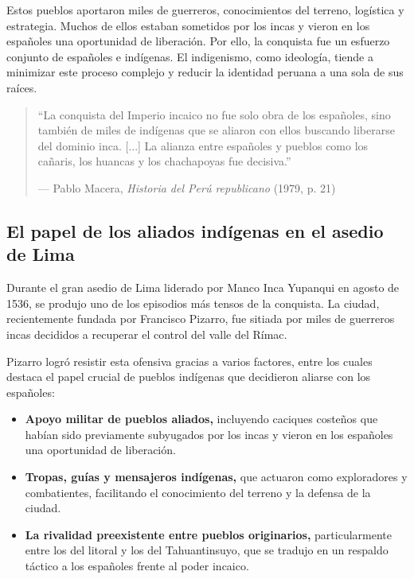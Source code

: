 \documentclass[a4paper,12pt]{article}
\begin{document}
Estos pueblos aportaron miles de guerreros, conocimientos del terreno, logística y estrategia. Muchos de ellos estaban sometidos por los incas y vieron en los españoles una oportunidad de liberación. Por ello, la conquista fue un esfuerzo conjunto de españoles e indígenas. El indigenismo, como ideología, tiende a minimizar este proceso complejo y reducir la identidad peruana a una sola de sus raíces.

\begin{quote}
	“La conquista del Imperio incaico no fue solo obra de los españoles, sino también de miles de indígenas que se aliaron con ellos buscando liberarse del dominio inca. [...] La alianza entre españoles y pueblos como los cañaris, los huancas y los chachapoyas fue decisiva.”
	\begin{flushright}
		— Pablo Macera, \textit{Historia del Perú republicano} (1979, p. 21)
	\end{flushright}
\end{quote}

\clearpage
\subsection*{El papel de los aliados indígenas en el asedio de Lima}

Durante el gran asedio de Lima liderado por Manco Inca Yupanqui en agosto de 1536, se produjo uno de los episodios más tensos de la conquista. La ciudad, recientemente fundada por Francisco Pizarro, fue sitiada por miles de guerreros incas decididos a recuperar el control del valle del Rímac.

Pizarro logró resistir esta ofensiva gracias a varios factores, entre los cuales destaca el papel crucial de pueblos indígenas que decidieron aliarse con los españoles:

\begin{itemize}
	\item \textbf{Apoyo militar de pueblos aliados,} incluyendo caciques costeños que habían sido previamente subyugados por los incas y vieron en los españoles una oportunidad de liberación.
	
	\item \textbf{Tropas, guías y mensajeros indígenas,} que actuaron como exploradores y combatientes, facilitando el conocimiento del terreno y la defensa de la ciudad.
	
	\item \textbf{La rivalidad preexistente entre pueblos originarios,} particularmente entre los del litoral y los del Tahuantinsuyo, que se tradujo en un respaldo táctico a los españoles frente al poder incaico.
\end{itemize}
\end{document}
